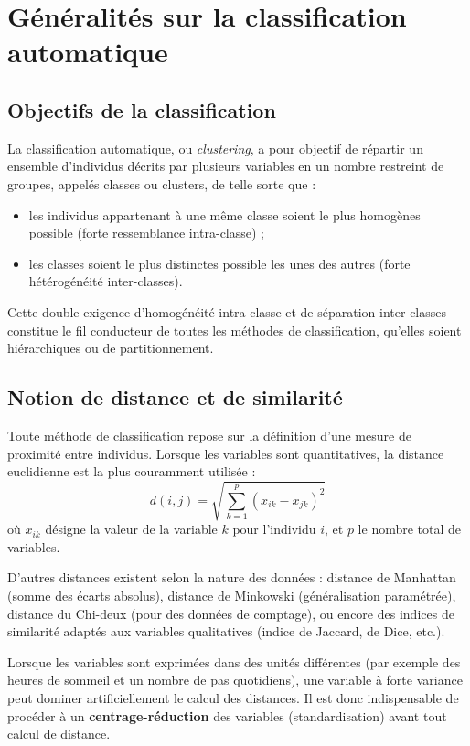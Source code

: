 \documentclass[11pt,a4paper]{report}
\begin{document}
	\chapter{Généralités sur la classification automatique}
	
	\section{Objectifs de la classification}
	
	La classification automatique, ou \emph{clustering}, a pour objectif de répartir un ensemble d'individus décrits par plusieurs variables en un nombre restreint de groupes, appelés classes ou clusters, de telle sorte que :
	
	\begin{itemize}
		\item les individus appartenant à une même classe soient le plus homogènes possible (forte ressemblance intra-classe) ;
		\item les classes soient le plus distinctes possible les unes des autres (forte hétérogénéité inter-classes).
	\end{itemize}
	
	Cette double exigence d'homogénéité intra-classe et de séparation inter-classes constitue le fil conducteur de toutes les méthodes de classification, qu'elles soient hiérarchiques ou de partitionnement.
	
	\section{Notion de distance et de similarité}
	
	Toute méthode de classification repose sur la définition d'une mesure de proximité entre individus. Lorsque les variables sont quantitatives, la distance euclidienne est la plus couramment utilisée :
	\[
	d(i,j) = \sqrt{\sum_{k=1}^{p} (x_{ik} - x_{jk})^2}
	\]
	où $x_{ik}$ désigne la valeur de la variable $k$ pour l'individu $i$, et $p$ le nombre total de variables.
	
	D'autres distances existent selon la nature des données : distance de Manhattan (somme des écarts absolus), distance de Minkowski (généralisation paramétrée), distance du Chi-deux (pour des données de comptage), ou encore des indices de similarité adaptés aux variables qualitatives (indice de Jaccard, de Dice, etc.).
	
	\begin{retenir}
		Lorsque les variables sont exprimées dans des unités différentes (par exemple des heures de sommeil et un nombre de pas quotidiens), une variable à forte variance peut dominer artificiellement le calcul des distances. Il est donc indispensable de procéder à un \textbf{centrage-réduction} des variables (standardisation) avant tout calcul de distance.
	\end{retenir}
	
\end{document}
